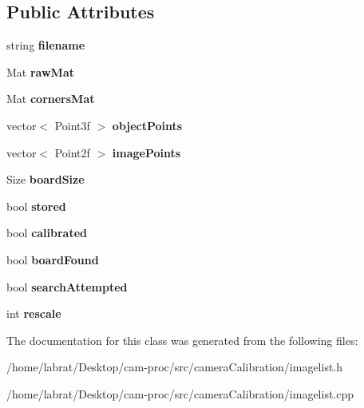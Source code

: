 \subsection*{Public Attributes}
\begin{DoxyCompactItemize}
\item 
string {\bfseries filename}\hypertarget{classcalImage_a8fd18e3c9e81289afacf67ce22e331e3}{}\label{classcalImage_a8fd18e3c9e81289afacf67ce22e331e3}

\item 
Mat {\bfseries raw\+Mat}\hypertarget{classcalImage_ae674e9be7d896119514a4ed145c80998}{}\label{classcalImage_ae674e9be7d896119514a4ed145c80998}

\item 
Mat {\bfseries corners\+Mat}\hypertarget{classcalImage_a4b6fd3a65815e477a9f193b1d85df0d9}{}\label{classcalImage_a4b6fd3a65815e477a9f193b1d85df0d9}

\item 
vector$<$ Point3f $>$ {\bfseries object\+Points}\hypertarget{classcalImage_a406fc0391ee929dfcf3e754030c6872c}{}\label{classcalImage_a406fc0391ee929dfcf3e754030c6872c}

\item 
vector$<$ Point2f $>$ {\bfseries image\+Points}\hypertarget{classcalImage_a89c04d6e73b4dd191012bdce26107d75}{}\label{classcalImage_a89c04d6e73b4dd191012bdce26107d75}

\item 
Size {\bfseries board\+Size}\hypertarget{classcalImage_a2f6a06bb79979d589a098e9c63747e39}{}\label{classcalImage_a2f6a06bb79979d589a098e9c63747e39}

\item 
bool {\bfseries stored}\hypertarget{classcalImage_a0aef3196e33b17f4d195112584c96a25}{}\label{classcalImage_a0aef3196e33b17f4d195112584c96a25}

\item 
bool {\bfseries calibrated}\hypertarget{classcalImage_af99b7ce653bf83e954cb7697383b5d1a}{}\label{classcalImage_af99b7ce653bf83e954cb7697383b5d1a}

\item 
bool {\bfseries board\+Found}\hypertarget{classcalImage_a0d0309664b85fcf317563ba06d1ad618}{}\label{classcalImage_a0d0309664b85fcf317563ba06d1ad618}

\item 
bool {\bfseries search\+Attempted}\hypertarget{classcalImage_aa4df698416085d78784de08c4d06f6a7}{}\label{classcalImage_aa4df698416085d78784de08c4d06f6a7}

\item 
int {\bfseries rescale}\hypertarget{classcalImage_ae560d69a693664c1e17ae504db1c87ea}{}\label{classcalImage_ae560d69a693664c1e17ae504db1c87ea}

\end{DoxyCompactItemize}


The documentation for this class was generated from the following files\+:\begin{DoxyCompactItemize}
\item 
/home/labrat/\+Desktop/cam-\/proc/src/camera\+Calibration/imagelist.\+h\item 
/home/labrat/\+Desktop/cam-\/proc/src/camera\+Calibration/imagelist.\+cpp\end{DoxyCompactItemize}
